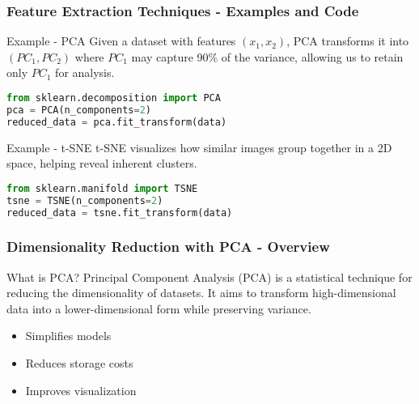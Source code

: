 \documentclass[aspectratio=169]{beamer}
\begin{document}
\begin{frame}[fragile]
    \frametitle{Feature Extraction Techniques - Examples and Code}
    \begin{block}{Example - PCA}
        Given a dataset with features \((x_1, x_2)\), PCA transforms it into \((PC_1, PC_2)\) where \(PC_1\) may capture 90\% of the variance, allowing us to retain only \(PC_1\) for analysis.
    \end{block}

    \begin{lstlisting}[language=Python]
from sklearn.decomposition import PCA
pca = PCA(n_components=2)
reduced_data = pca.fit_transform(data)
    \end{lstlisting}

    \begin{block}{Example - t-SNE}
        t-SNE visualizes how similar images group together in a 2D space, helping reveal inherent clusters.
    \end{block}

    \begin{lstlisting}[language=Python]
from sklearn.manifold import TSNE
tsne = TSNE(n_components=2)
reduced_data = tsne.fit_transform(data)
    \end{lstlisting}
\end{frame}

\begin{frame}[fragile]
    \frametitle{Dimensionality Reduction with PCA - Overview}
    
    \begin{block}{What is PCA?}
        Principal Component Analysis (PCA) is a statistical technique for reducing the dimensionality of datasets. It aims to transform high-dimensional data into a lower-dimensional form while preserving variance.
    \end{block}
    
    \begin{itemize}
        \item Simplifies models
        \item Reduces storage costs
        \item Improves visualization
    \end{itemize}
\end{frame}
\end{document}
